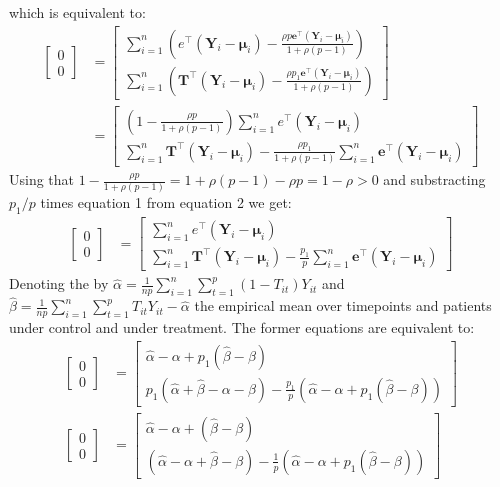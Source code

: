 \documentclass[12pt]{article}
\newcommand\Ve{\mathbf{e}}
\newcommand\VT{\mathbf{T}}
\newcommand\VY{\mathbf{Y}}
\newcommand\Vmu{\boldsymbol{\mu}}
\newcommand\trans[1]{{#1}^\intercal}%
\begin{document}
which is equivalent to:
\begin{align*}
\begin{bmatrix}
0 \\ 0
\end{bmatrix}
&=
\begin{bmatrix}
\sum_{i=1}^n \left(\trans{e}(\VY_i-\Vmu_i)- \frac{\rho p \trans{\Ve}(\VY_i-\Vmu_i)}{1+\rho(p-1)}\right) \\
\sum_{i=1}^n \left(\trans{\VT}(\VY_i-\Vmu_i)- \frac{\rho p_1 \trans{\Ve}(\VY_i-\Vmu_i)}{1+\rho(p-1)}\right) 
\end{bmatrix} \\ 
& =
\begin{bmatrix}
\left(1 - \frac{\rho p}{1+\rho(p-1)}\right) \sum_{i=1}^n \trans{e}(\VY_i-\Vmu_i) \\
\sum_{i=1}^n \trans{\VT}(\VY_i-\Vmu_i)- \frac{\rho p_1}{1+\rho(p-1)} \sum_{i=1}^n \trans{\Ve}(\VY_i-\Vmu_i)
\end{bmatrix}
\end{align*}
Using that \(1 - \frac{\rho p}{1+\rho(p-1)} = 1 + \rho(p-1) - \rho p =
1 - \rho > 0\) and substracting \(p_1/p\) times equation 1 from equation 2 we get:
\begin{align*}
\begin{bmatrix}
0 \\ 0
\end{bmatrix}
& =
\begin{bmatrix}
\sum_{i=1}^n \trans{e}(\VY_i-\Vmu_i) \\
\sum_{i=1}^n \trans{\VT}(\VY_i-\Vmu_i) - \frac{p_1}{p}\sum_{i=1}^n \trans{\Ve}(\VY_i-\Vmu_i)
\end{bmatrix}
\end{align*}
Denoting the by \(\widehat{\alpha}= \frac{1}{np} \sum_{i=1}^n
\sum_{t=1}^p (1-T_{it}) Y_{it}\) and \(\widehat{\beta}= \frac{1}{np}
\sum_{i=1}^n \sum_{t=1}^p T_{it} Y_{it} - \widehat{\alpha}\) the
empirical mean over timepoints and patients under control and under
treatment. The former equations are equivalent to:
\begin{align*}
\begin{bmatrix}
0 \\ 0
\end{bmatrix}
& =
\begin{bmatrix}
\widehat{\alpha} - \alpha + p_1 (\widehat{\beta} - \beta) \\
p_1 (\widehat{\alpha} + \widehat{\beta} - \alpha - \beta) - \frac{p_1}{p} (\widehat{\alpha} - \alpha + p_1 (\widehat{\beta} - \beta))
\end{bmatrix} \\
\begin{bmatrix}
0 \\ 0
\end{bmatrix} 
& =
\begin{bmatrix}
\widehat{\alpha} - \alpha + (\widehat{\beta} - \beta) \\
(\widehat{\alpha} - \alpha + \widehat{\beta} - \beta ) - \frac{1}{p} (\widehat{\alpha} - \alpha + p_1 (\widehat{\beta} - \beta))
\end{bmatrix} 
\end{align*}
\end{document}
